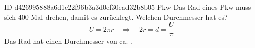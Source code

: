 \begin{exercise}
      {ID-d426995888a6d1e22f96b3a3d0ef30ead32b8b05}
      {Pkw}
  \ifproblem\problem
    Das Rad eines Pkw muss sich \num{400} Mal drehen, damit es 
    zurücklegt. Welchen Durchmesser hat es?
  \fi
  \ifoutline\outline
    \begin{equation*}
      U=2\pi r
      \quad\Rightarrow\quad
      2r=d=\frac{U}{\pi}
    \end{equation*}
  \fi
  \ifoutcome\outcome
    Das Rad hat einen Durchmesser von ca. .
  \fi
\end{exercise}
